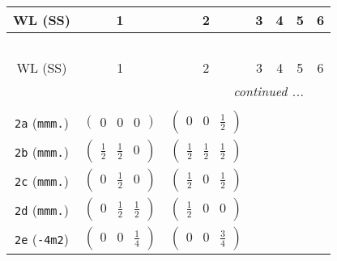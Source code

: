 \documentclass[fleqn,9pt,landscape]{jsarticle}
\begin{document}
\begin{center}
\renewcommand{\arraystretch}{1.2}
\begin{longtable}{ccccccc}
 \hline \hline
WL (SS) & 1 & 2 & 3 & 4 & 5 & 6 \\ \hline \endfirsthead

\multicolumn{6}{l}{\tablename\ \thetable{}} \\
 \hline \hline
WL (SS) & 1 & 2 & 3 & 4 & 5 & 6 \\ \hline \endhead

 \hline \hline
\multicolumn{6}{r}{\footnotesize\it continued ...} \\ \endfoot

 \hline \hline
\multicolumn{6}{r}{} \\ \endlastfoot

{\tt 2a} ({\tt mmm.}) & $ \begin{pmatrix} 0 & 0 & 0 \end{pmatrix} $ & $ \begin{pmatrix} 0 & 0 & \frac{1}{2} \end{pmatrix} $ & $  $ & $  $ & $  $ & $  $ \\ \hline
{\tt 2b} ({\tt mmm.}) & $ \begin{pmatrix} \frac{1}{2} & \frac{1}{2} & 0 \end{pmatrix} $ & $ \begin{pmatrix} \frac{1}{2} & \frac{1}{2} & \frac{1}{2} \end{pmatrix} $ & $  $ & $  $ & $  $ & $  $ \\ \hline
{\tt 2c} ({\tt mmm.}) & $ \begin{pmatrix} 0 & \frac{1}{2} & 0 \end{pmatrix} $ & $ \begin{pmatrix} \frac{1}{2} & 0 & \frac{1}{2} \end{pmatrix} $ & $  $ & $  $ & $  $ & $  $ \\ \hline
{\tt 2d} ({\tt mmm.}) & $ \begin{pmatrix} 0 & \frac{1}{2} & \frac{1}{2} \end{pmatrix} $ & $ \begin{pmatrix} \frac{1}{2} & 0 & 0 \end{pmatrix} $ & $  $ & $  $ & $  $ & $  $ \\ \hline
{\tt 2e} ({\tt -4m2}) & $ \begin{pmatrix} 0 & 0 & \frac{1}{4} \end{pmatrix} $ & $ \begin{pmatrix} 0 & 0 & \frac{3}{4} \end{pmatrix} $ & $  $ & $  $ & $  $ & $  $ \\ \hline

\end{longtable}
\end{center}
\end{document}

